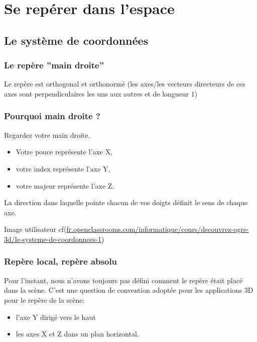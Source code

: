 

\chapter{Se repérer dans l'espace}


\section{Le système de coordonnées}


\subsection{Le repère ''main droite''}

Le repère est orthogonal et orthonormé (les axes/les vecteurs directeurs de ces axes sont perpendiculaires les uns aux autres et de longueur 1)



\subsection{Pourquoi main droite ?}

Regardez votre main droite.
\begin{itemize} 
\item Votre pouce représente l'axe X, 
\item votre index représente l'axe Y,
\item votre majeur représente l'axe Z. 
\end{itemize}

La direction dans laquelle pointe chacun de vos doigts définit le sens de chaque axe.

Image utilisateur cf(\url{fr.openclassrooms.com/informatique/cours/decouvrez-ogre-3d/le-systeme-de-coordonnees-1})





\subsection{Repère local, repère absolu}

Pour l'instant, nous n'avons toujours pas défini comment le repère était placé dans la scène. C'est une question de convention adoptée pour les applications 3D	pour le repère de la scène:
\begin{itemize}
\item l'axe Y dirigé vers le haut 
\item les axes X et Z dans un plan horizontal.
\end{itemize}


